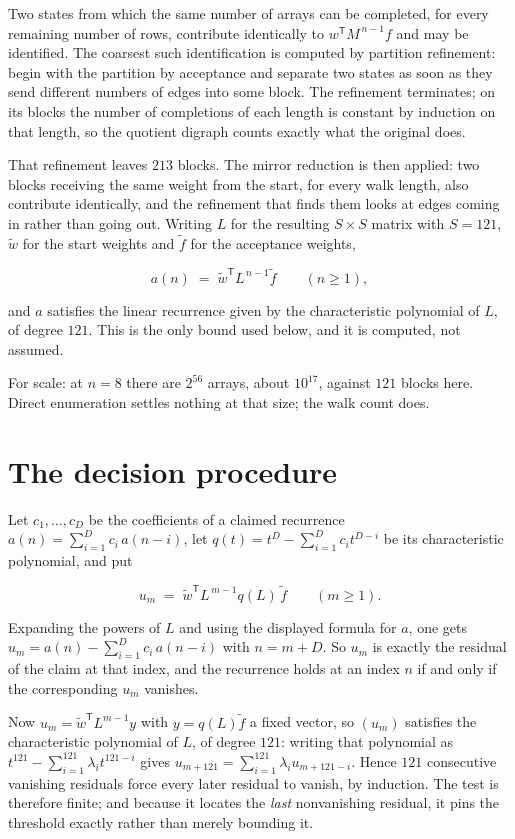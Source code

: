 \documentclass[11pt]{article}
\theoremstyle{definition}
\begin{document}
Two states from which the same number of arrays can be completed, for every remaining number of rows, contribute identically to $w^{\mathsf T}M^{\,n-1}f$ and may be identified. The coarsest such identification is computed by partition refinement: begin with the partition by acceptance and separate two states as soon as they send different numbers of edges into some block. The refinement terminates; on its blocks the number of completions of each length is constant by induction on that length, so the quotient digraph counts exactly what the original does.

That refinement leaves $213$ blocks. The mirror reduction is then applied: two blocks receiving the same weight from the start, for every walk length, also contribute identically, and the refinement that finds them looks at edges coming in rather than going out. Writing $L$ for the resulting $S \times S$ matrix with $S = 121$, $\tilde w$ for the start weights and $\tilde f$ for the acceptance weights,

\[a(n) \;=\; \tilde w^{\mathsf T} L^{\,n-1} \tilde f \qquad (n \ge 1),\]

and $a$ satisfies the linear recurrence given by the characteristic polynomial of $L$, of degree $121$. This is the only bound used below, and it is computed, not assumed.

For scale: at $n = 8$ there are $2^{56}$ arrays, about $10^{17}$, against $121$ blocks here. Direct enumeration settles nothing at that size; the walk count does.

\section{The decision procedure}

Let $c_1,\dots,c_D$ be the coefficients of a claimed recurrence $a(n) = \sum_{i=1}^{D} c_i\,a(n-i)$, let $q(t) = t^{D} - \sum_{i=1}^{D} c_i t^{D-i}$ be its characteristic polynomial, and put

\[u_m \;=\; \tilde w^{\mathsf T} L^{\,m-1} q(L)\,\tilde f \qquad (m \ge 1).\]

Expanding the powers of $L$ and using the displayed formula for $a$, one gets $u_m = a(n) - \sum_{i=1}^{D} c_i\,a(n-i)$ with $n = m + D$. So $u_m$ is exactly the residual of the claim at that index, and the recurrence holds at an index $n$ if and only if the corresponding $u_m$ vanishes.

Now $u_m = \tilde w^{\mathsf T} L^{m-1} y$ with $y = q(L)\tilde f$ a fixed vector, so $(u_m)$ satisfies the characteristic polynomial of $L$, of degree $121$: writing that polynomial as $t^{121} - \sum_{i=1}^{121} \lambda_i t^{121-i}$ gives $u_{m+121} = \sum_{i=1}^{121} \lambda_i u_{m+121-i}$. Hence $121$ consecutive vanishing residuals force every later residual to vanish, by induction. The test is therefore finite; and because it locates the {\itshape last} nonvanishing residual, it pins the threshold exactly rather than merely bounding it.
\end{document}
